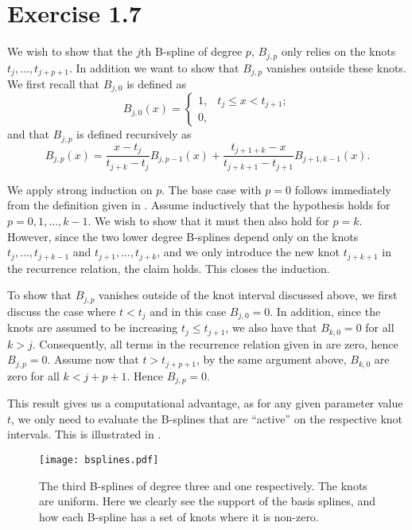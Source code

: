 \documentclass[12pt, article, oneside]{memoir}
\begin{document}
\chapter*{Exercise 1.7}
\label{cha:exercise_1_7}

We wish to show that the \(j\)th B-spline of degree \(p\), \(B_{j, p}\) only
relies on the knots \(t_j, \ldots, t_{j+p+1}\). In addition we want to show
that \(B_{j, p}\) vanishes outside these knots. We first recall that \(B_{j,
0}\) is defined as
\begin{equation}
    \label{eq:def}
    B_{j, 0}(x) = \begin{cases}
        1, & t_j \leq x < t_{j+1};\\
        0,
    \end{cases}
\end{equation}
and that \(B_{j, p}\) is defined recursively as
\begin{equation}
    \label{eq:rec}
    B_{j, p}(x) = \frac{x - t_j}{t_{j+k} - t_j}B_{j, p-1}(x) + \frac{t_{j+1+k} - x}{t_{j+k+1} - t_{j+1}} B_{j+1, k-1}(x).
\end{equation}

We apply strong induction on \(p\). The base case with \(p = 0\) follows
immediately from the definition given in . Assume inductively that
the hypothesis holds for \(p = 0, 1, \ldots, k - 1\). We wish to show that it
must then also hold for \(p = k\). However, since the two lower degree
B-splines depend only on the knots \(t_j, \ldots, t_{j+k-1}\) and \(t_{j + 1},
\ldots, t_{j+k}\), and we only introduce the new knot \(t_{j+k+1}\) in the
recurrence relation, the claim holds. This closes the induction.

To show that \(B_{j, p}\) vanishes outside of the knot interval discussed
above, we first discuss the case where \(t <t_j\) and in this case \(B_{j,0}
= 0\). In addition, since the knots are assumed to be increasing \(t_j \leq
t_{j+1}\), we also have that \(B_{k, 0} = 0\) for all \(k > j\). Consequently,
all terms in the recurrence relation given in  are zero, hence
\(B_{j, p} = 0\). Assume now that \(t > t_{j+p+1}\), by the same argument
above, \(B_{k, 0}\) are zero for all \(k < j + p + 1\). Hence \(B_{j, p} = 0\).

This result gives us a computational advantage, as for any given parameter
value $t$, we only need to evaluate the B-splines that are ``active'' on
the respective knot intervals. This is illustrated in
.

\begin{figure}[tpb]
    \centering
    \texttt{[image: bsplines.pdf]}
    \caption{The third B-splines of degree three and one respectively. The
    knots are uniform. Here we clearly see the support of the basis
splines, and how each B-spline has a set of knots where it is non-zero.}
    \label{fig:activesplines}
\end{figure}
\end{document}
